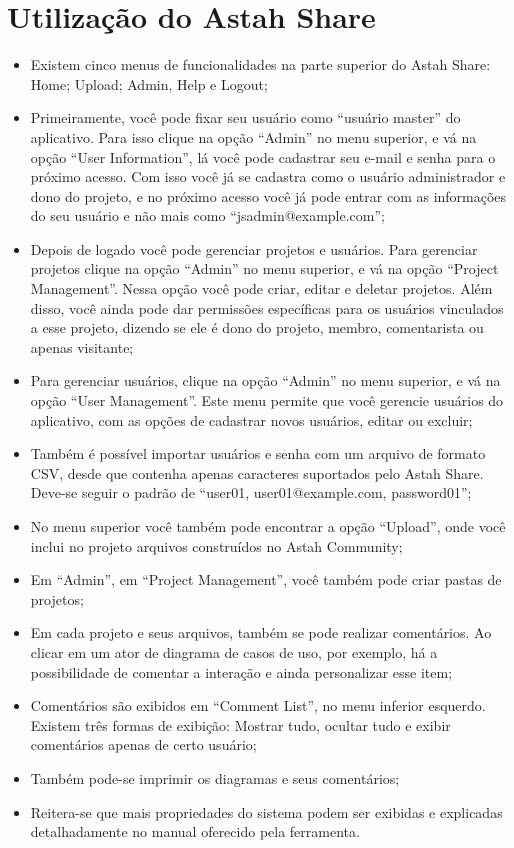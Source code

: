 \documentclass[12pt,a4paper]{article}
\begin{document}
\section{Utilização do Astah Share}

\begin{itemize}
\item Existem cinco menus de funcionalidades na parte superior do Astah Share: Home; Upload; Admin, Help e Logout;
\item Primeiramente, você pode fixar seu usuário como “usuário master” do aplicativo. Para isso clique na opção “Admin” no menu superior, e vá na opção “User Information”, lá você pode cadastrar seu e-mail e senha para o próximo acesso. Com isso você já se cadastra como o usuário administrador e dono do projeto, e no próximo acesso você já pode entrar com as informações do seu usuário e não mais como “jsadmin@example.com”;
\item Depois de logado você pode gerenciar projetos e usuários. Para gerenciar projetos clique na opção “Admin” no menu superior, e vá na opção “Project Management”. Nessa opção você pode criar, editar e deletar projetos. Além disso, você ainda pode dar permissões específicas para os usuários vinculados a esse projeto, dizendo se ele é dono do projeto, membro, comentarista ou apenas visitante;
\item Para gerenciar usuários, clique na opção “Admin” no menu superior, e vá na opção “User Management”. Este menu permite que você gerencie usuários do aplicativo, com as opções de cadastrar novos usuários, editar ou excluir;
\item Também é possível importar usuários e senha com um arquivo de formato CSV, desde que contenha apenas caracteres suportados pelo Astah Share. Deve-se seguir o padrão de “user01, user01@example.com, password01”;
\item No menu superior você também pode encontrar a opção “Upload”, onde você inclui no projeto arquivos construídos no Astah Community;
\item Em “Admin”, em “Project Management”, você também pode criar pastas de projetos;
\item Em cada projeto e seus arquivos, também se pode realizar comentários. Ao clicar em um ator de diagrama de casos de uso, por exemplo, há a possibilidade de comentar a interação e ainda personalizar esse item;
\item Comentários são exibidos em “Comment List”, no menu inferior esquerdo. Existem três formas de exibição: Mostrar tudo, ocultar tudo e exibir comentários apenas de certo usuário;
\item Também pode-se imprimir os diagramas e seus comentários;
\item Reitera-se que mais propriedades do sistema podem ser exibidas e explicadas detalhadamente no manual oferecido pela ferramenta.

\end{itemize}
\end{document}
